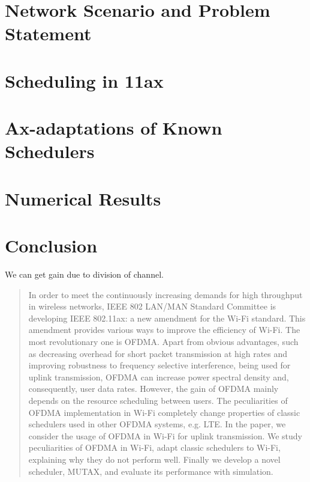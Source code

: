 \section{Network Scenario and Problem Statement}

\section{Scheduling in 11ax}

\section{Ax-adaptations of Known Schedulers}

\section{Numerical Results}

\section{Conclusion}

We can get gain due to division of channel. 


















\clearpage

\begin{abstract}
In order to meet the continuously increasing demands for high throughput in wireless networks, IEEE 802 LAN/MAN Standard Committee is developing IEEE 802.11ax: a new amendment for the Wi-Fi standard.
This amendment provides various ways to improve the efficiency of Wi-Fi. The most revolutionary one is OFDMA.
Apart from obvious advantages, such as decreasing overhead for short packet transmission at high rates and improving robustness to frequency selective interference, being used for uplink transmission, OFDMA can increase power spectral density and, consequently, user data rates. However, the gain of OFDMA mainly depends on the resource scheduling between users.
The peculiarities of OFDMA implementation in Wi-Fi completely change properties of classic schedulers used in other OFDMA systems, e.g. LTE. 
In the paper, we consider the usage of OFDMA in Wi-Fi for uplink transmission.
We study peculiarities of OFDMA in Wi-Fi, adapt classic schedulers to Wi-Fi, explaining why they do not perform well.
Finally we develop a novel scheduler, MUTAX, and evaluate its performance with simulation. 
\end{abstract}

